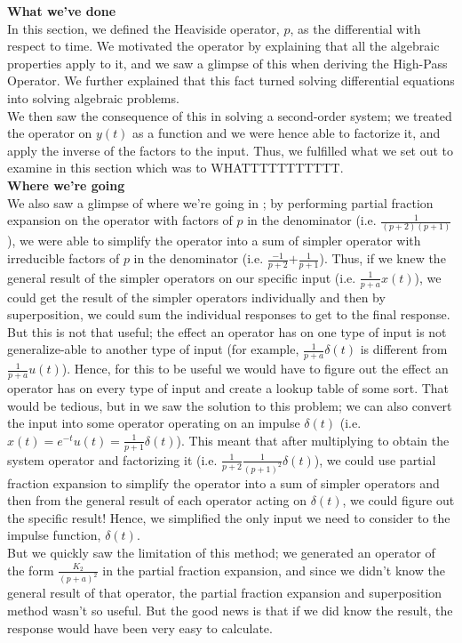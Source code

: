 \documentclass{report}
\begin{document}
\textbf{What we've done}\\
In this section, we defined the Heaviside operator, $p$, as the differential with respect to time. We motivated the operator by explaining that all the algebraic properties apply to it, and we saw a glimpse of this when deriving the High-Pass Operator. We further explained that this fact turned solving differential equations into solving algebraic problems. \\
We then saw the consequence of this in solving a second-order system; we treated the operator on $y(t)$ as a function and we were hence able to factorize it, and apply the inverse of the factors to the input. Thus, we fulfilled what we set out to examine in this section which was to WHATTTTTTTTTTT. \smallskip \\
\textbf{Where we're going}\\
We also saw a glimpse of where we're going in ; by performing partial fraction expansion on the operator with factors of $p$ in the denominator (i.e. $\tfrac{1}{(p+2)(p+1)}$), we were able to simplify the operator into a sum of simpler operator with irreducible factors of $p$ in the denominator (i.e. $\tfrac{-1}{p+2}\text{+}\tfrac{1}{p+1}$). Thus, if we knew the general result of the simpler operators on our specific input (i.e. $\tfrac{1}{p+a}x(t)$), we could get the result of the simpler operators individually and then by superposition, we could sum the individual responses to get to the final response. \smallskip \\
But this is not that useful; the effect an operator has on one type of input is not generalize-able to another type of input (for example, $\tfrac{1}{p+a}\delta(t)$ is different from $\tfrac{1}{p+a}u(t)$). Hence, for this to be useful we would have to figure out the effect an operator has on every type of input and create a lookup table of some sort. That would be tedious, but in  we saw the solution to this problem; we can also convert the input into some operator operating on an impulse $\delta(t)$ (i.e. $x(t) = e^{-t}u(t) = \tfrac{1}{p+1}\delta(t)$). This meant that after multiplying to obtain the system operator and factorizing it (i.e. $\tfrac{1}{p + 2}\tfrac{1}{(p + 1)^2}\delta(t)$), we could use partial fraction expansion to simplify the operator into a sum of simpler operators and then from the general result of each operator acting on $\delta(t)$, we could figure out the specific result! Hence, we simplified the only input we need to consider to the impulse function, $\delta(t)$. \\
But we quickly saw the limitation of this method; we generated an operator of the form $\tfrac{K_2}{(p+a)^2}$ in the partial fraction expansion, and since we didn't know the general result of that operator, the partial fraction expansion and superposition method wasn't so useful. But the good news is that if we did know the result, the response would have been very easy to calculate. \medskip 
\end{document}

